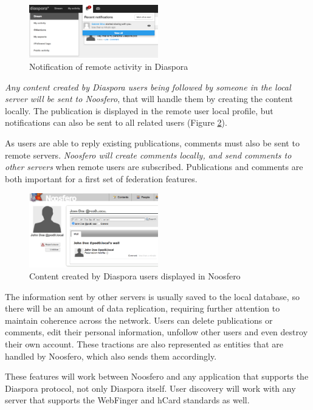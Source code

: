 \begin{figure}[hbt]
  \centering
    \includegraphics[width=0.5\textwidth]{figures/diaspora_notification.eps}
  \caption{Notification of remote activity in Diaspora}
  \label{fig:diaspora_notification}
\end{figure}

\textit{Any content created by Diaspora users being followed by someone in the
local server will be sent to Noosfero}, that will handle them by creating
the content locally. The publication is displayed in the remote user
local profile, but notifications can also be sent to all related users
(Figure \ref{fig:noosfero_remote_wall}).

As users are able to reply existing publications, comments must also be sent
to remote servers. \textit{Noosfero will create comments locally, and send
comments to other servers} when remote users are subscribed. Publications
and comments are both important for a first set of federation features.

\begin{figure}[hbt]
  \centering
    \includegraphics[width=0.5\textwidth]{figures/noosfero_remote_wall.eps}
  \caption{Content created by Diaspora users displayed in Noosfero}
  \label{fig:noosfero_remote_wall}
\end{figure}

The information sent by other servers is usually saved to the local database, so
there will be an amount of data replication, requiring further attention to maintain
coherence across the network. Users can delete publications or comments, edit their
personal information, unfollow other users and even destroy their own account. These
tractions are also represented as entities that are handled by Noosfero, which also
sends them accordingly.

These features will work between Noosfero and any application that
supports the Diaspora protocol, not only Diaspora itself. User discovery
will work with any server that supports the WebFinger and hCard
standards as well.
